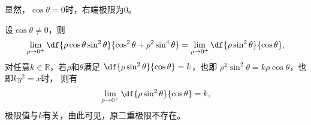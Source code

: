 显然，$\cos\theta=0$时，右端极限为$0$。

设$\cos\theta\ne 0$，则
$$\lim\limits_{\rho\to0^+}\df{\rho\cos\theta\sin^2\theta}
{\cos^2\theta+\rho^2\sin^4\theta}
=\lim\limits_{\rho\to0^+}\df{\rho\sin^2\theta}{\cos\theta},$$
对任意$k\in\mathbb{R}，$若$\rho$和$\theta$满足
$\df{\rho\sin^2\theta}{\cos\theta}=k$，也即
$\rho^2\sin^2\theta=k\rho\cos\theta$，也即$ky^2=x$时，
则有
$$\lim\limits_{\rho\to0^+}\df{\rho\sin^2\theta}{\cos\theta}=k,$$
极限值与$k$有关，由此可见，原二重极限不存在。

% 	
% 	
% 	
% 	
% 	
% 	
% 	
% 	
% 	
% 	
% 	
% 	
% 	
% 	
% 

